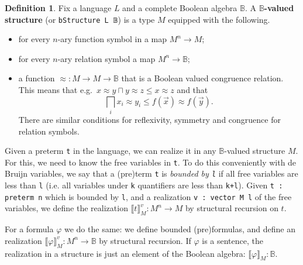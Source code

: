 \documentclass[sigplan,10pt,review]{acmart}
\newcommand{\B}{\mathbb{B}}
\newcommand{\lil}{\lstinline}
\theoremstyle{definition}
\newtheorem{defn}{Definition}[section]
\begin{document}
\begin{defn}\label{def:boolean-valued-structure}
  Fix a language $L$ and a complete Boolean algebra $\B$. A \textbf{$\B$-valued structure} (or \lil{bStructure L 𝔹}) is a type $M$ equipped with the following.
  \begin{itemize}
    \item for every $n$-ary function symbol in a map $M^n \to M$;
    \item for every $n$-ary relation symbol a map $M^n \to \B$;
    \item a function ${\approx}:M\to M\to\B$ that is a Boolean valued congruence relation. This means that e.g.\
    $x\approx y\sqcap y\approx z\le x\approx z$ and that \[\bigsqcap_i x_i\approx y_i \le f(\vec x)\approx f(\vec y).\]
    There are similar conditions for reflexivity, symmetry and congruence for relation symbols.
  \end{itemize}
\end{defn}

Given a preterm \lil{t} in the language, we can realize it in any $\B$-valued structure $M$.
For this, we need to know the free variables in \lil{t}.
To do this conveniently with de Bruijn variables, we say that a (pre)term \lil{t} is \emph{bounded by \lil{l}} if all free variables are less than \lil{l} (i.e. all variables under \lil{k} quantifiers are less than \lil{k+l}).
Given \lil{t : preterm n} which is bounded by \lil{l}, and a realization \lil{v : vector M l} of the free variables, we define the realization $\llbracket t \rrbracket_M^v : M^n \to M$ by structural recursion on $t$.

For a formula $\varphi$ we do the same: we define bounded (pre)formulas, and define an realization $\llbracket \varphi \rrbracket_M^v : M^n \to \B$ by structural recursion.
If $\varphi$ is a sentence, the realization in a structure is just an element of the Boolean algebra: $\llbracket \varphi \rrbracket_M : \B$.
\end{document}
